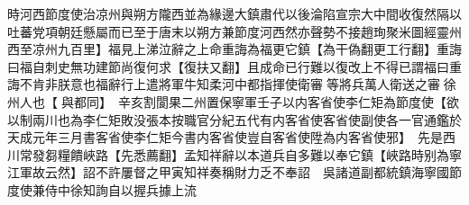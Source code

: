 時河西節度使治凉州與朔方隴西並為緣邊大鎮肅代以後淪陷宣宗大中間收復然隔以吐蕃党項朝廷懸屬而已至于唐末以朔方兼節度河西然亦聲勢不接趙珣聚米圖經靈州西至凉州九百里】福見上涕泣辭之上命重誨為福更它鎮【為干偽翻更工行翻】重誨曰福自刺史無功建節尚復何求【復扶又翻】且成命已行難以復改上不得已謂福曰重誨不肯非朕意也福辭行上遣將軍牛知柔河中都指揮使衛審等將兵萬人衛送之審徐州人也【與都同】　辛亥割閬果二州置保寧軍壬子以内客省使李仁矩為節度使【欲以制兩川也為李仁矩敗没張本按職官分紀五代有内客省使客省使副使各一官通鑑於天成元年三月書客省使李仁矩今書内客省使豈自客省使陞為内客省使邪】　先是西川常發芻糧饋峽路【先悉薦翻】孟知祥辭以本道兵自多難以奉它鎮【峽路時别為寧江軍故云然】詔不許屢督之甲寅知祥奏稱財力乏不奉詔　吳諸道副都統鎮海寧國節度使兼侍中徐知詢自以握兵據上流